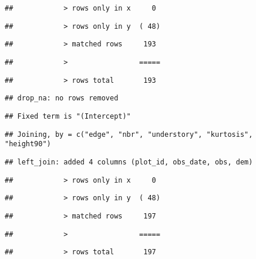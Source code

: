 \documentclass[
]{article}
\begin{document}
\begin{verbatim}
##            > rows only in x     0
\end{verbatim}

\begin{verbatim}
##            > rows only in y  ( 48)
\end{verbatim}

\begin{verbatim}
##            > matched rows     193
\end{verbatim}

\begin{verbatim}
##            >                 =====
\end{verbatim}

\begin{verbatim}
##            > rows total       193
\end{verbatim}

\begin{verbatim}
## drop_na: no rows removed
\end{verbatim}

\begin{verbatim}
## Fixed term is "(Intercept)"
\end{verbatim}

\begin{verbatim}
## Joining, by = c("edge", "nbr", "understory", "kurtosis", "height90")
\end{verbatim}

\begin{verbatim}
## left_join: added 4 columns (plot_id, obs_date, obs, dem)
\end{verbatim}

\begin{verbatim}
##            > rows only in x     0
\end{verbatim}

\begin{verbatim}
##            > rows only in y  ( 48)
\end{verbatim}

\begin{verbatim}
##            > matched rows     197
\end{verbatim}

\begin{verbatim}
##            >                 =====
\end{verbatim}

\begin{verbatim}
##            > rows total       197
\end{verbatim}
\end{document}
